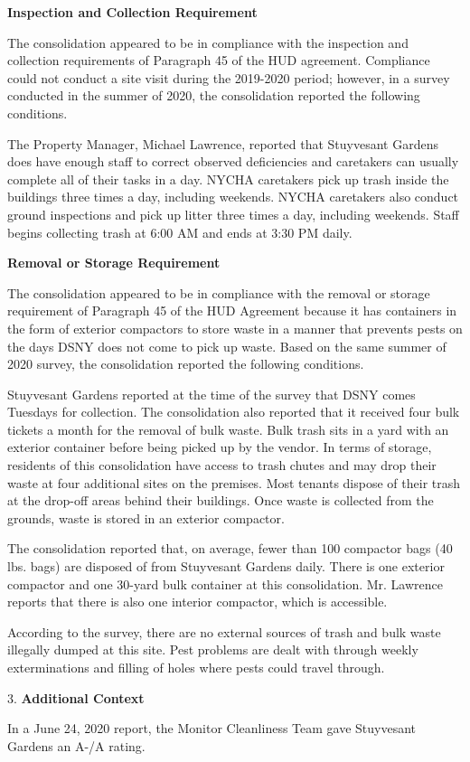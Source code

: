 

\textbf{Inspection and Collection Requirement}

The consolidation appeared to be in compliance with the inspection and collection requirements of Paragraph 45 of the HUD agreement. Compliance could not conduct a site visit during the 2019-2020 period; however, in a survey conducted in the summer of 2020, the consolidation reported the following conditions.

The Property Manager, Michael Lawrence, reported that Stuyvesant Gardens does have enough staff to correct observed deficiencies and caretakers can usually complete all of their tasks in a day. NYCHA caretakers pick up trash inside the buildings three times a day, including weekends. NYCHA caretakers also conduct ground inspections and pick up litter three times a day, including weekends. Staff begins collecting trash at 6:00 AM  and ends at 3:30 PM daily. 

\textbf{Removal or Storage Requirement}

The consolidation appeared to be in compliance with the  removal or storage requirement of Paragraph  45 of the HUD Agreement because it has containers in the form of exterior compactors to store waste in a manner that prevents pests on the days DSNY does not come to pick up waste. Based on the same summer of  2020 survey, the consolidation reported the following conditions.

Stuyvesant Gardens reported at the time of the survey that DSNY comes Tuesdays for collection. The consolidation also reported that it received four bulk tickets a month for the removal of bulk waste. Bulk trash sits in a yard with an exterior container before being picked up by the vendor. In terms of storage, residents of this consolidation have access to trash chutes and may drop their waste at four additional sites on the premises.  Most tenants dispose of their trash at the drop-off areas behind their buildings. Once waste is collected from the grounds, waste is stored in an exterior compactor.

The consolidation reported that, on average, fewer than 100 compactor bags (40 lbs. bags) are disposed of from Stuyvesant Gardens daily. There is one exterior compactor and one 30-yard bulk container at this consolidation. Mr. Lawrence reports that there is also one interior compactor, which is accessible.

According to the survey, there are no external sources of trash and bulk waste illegally dumped at this site. Pest problems are dealt with through weekly exterminations and filling of holes where pests could travel through.

3. \textbf{Additional Context} 

In a June 24, 2020 report, the Monitor Cleanliness Team gave Stuyvesant Gardens an A-/A rating. 